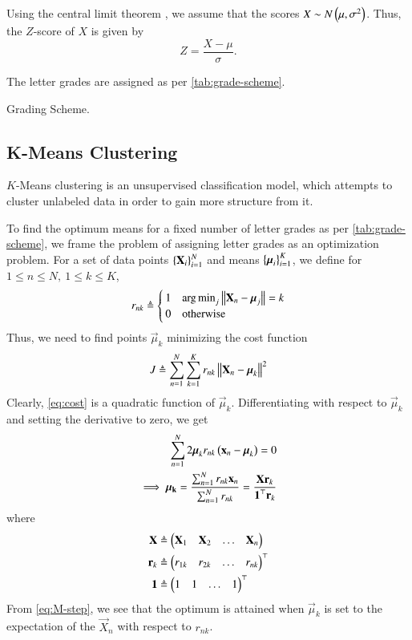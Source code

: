 \documentclass[conference]{IEEEtran}
\DeclareMathOperator*{\argmin}{arg\,min}
\begin{document}
Using the central limit theorem \cite{spiegelSchaumsOutlineStatistics2018}, we
assume that the scores $X \sim N\left(\mu,\sigma^2\right)$. Thus, the $Z$-score of $X$
is given by
\begin{equation}
    Z = \frac{X-\mu}{\sigma}.
\end{equation}

The letter grades are assigned as per \autoref{tab:grade-scheme}.
\begin{table}[!ht]
    \centering
    
    \caption{Grading Scheme.}
    \label{tab:grade-scheme}
\end{table}

\subsection{K-Means Clustering}
$K$-Means clustering \cite{macqueenMethodsClassificationAnalysis1967} is an
unsupervised classification model, which attempts to cluster unlabeled data in
order to gain more structure from it. 

To find the optimum means for a fixed number of letter grades as per
\autoref{tab:grade-scheme}, we frame the problem of assigning letter grades as
an optimization problem. For a set of data points $\left\{\boldsymbol{\mathbf{X}}_i\right\}_{i=1}^N$
and means $\left\{\boldsymbol{\mathbf{\mu}}_i\right\}_{i=1}^K$, we define for $1 \le n \le N,\ 1 \le k
\le K$,
\begin{equation}
    r_{nk} \triangleq
    \begin{cases}
        1 & \argmin_{j}\norm{\vec{X}_n-\vec{\mu}_j} = k \\
        0 & \textrm{otherwise}
    \end{cases}
    \label{eq:rnk-def}
\end{equation}
Thus, we need to find points $\vec{\mu}_k$ minimizing the cost function
\begin{equation}
    J \triangleq \sum_{n=1}^N\sum_{k=1}^Kr_{nk}\left\lVert\boldsymbol{\mathbf{X}}_n-\boldsymbol{\mathbf{\mu}}_k\right\rVert^2
    \label{eq:cost}
\end{equation}
Clearly, \eqref{eq:cost} is a quadratic function of $\vec{\mu}_k$.
Differentiating with respect to $\vec{\mu}_k$ and setting the derivative to
zero, we get
\begin{align}
    \sum_{n=1}^N2\boldsymbol{\mathbf{\mu}}_kr_{nk}\left(\boldsymbol{\mathbf{x}}_n-\boldsymbol{\mathbf{\mu}}_k\right) = 0 \\
    \implies \boldsymbol{\mathbf{\mu_k}} = \frac{\sum_{n=1}^Nr_{nk}\boldsymbol{\mathbf{x}}_n}{\sum_{n=1}^Nr_{nk}} = \frac{\boldsymbol{\mathbf{Xr}}_k}{\boldsymbol{\mathbf{1}}^\top\boldsymbol{\mathbf{r}}_k}
    \label{eq:M-step}
\end{align}
where
\begin{align}
    \boldsymbol{\mathbf{X}} &\triangleq \begin{pmatrix}\boldsymbol{\mathbf{X}}_1&\boldsymbol{\mathbf{X}}_2&\ldots&\boldsymbol{\mathbf{X}}_n\end{pmatrix} \\
    \boldsymbol{\mathbf{r}}_k &\triangleq \begin{pmatrix}r_{1k}&r_{2k}&\ldots&r_{nk}\end{pmatrix}^\top \\
    \boldsymbol{\mathbf{1}} &\triangleq \begin{pmatrix}1&1&\ldots&1\end{pmatrix}^\top
    \label{eq:M-defs}
\end{align}
From \eqref{eq:M-step}, we see that the optimum is attained when $\vec{\mu}_k$
is set to the expectation of the $\vec{X}_n$ with respect to $r_{nk}$.
\end{document}
